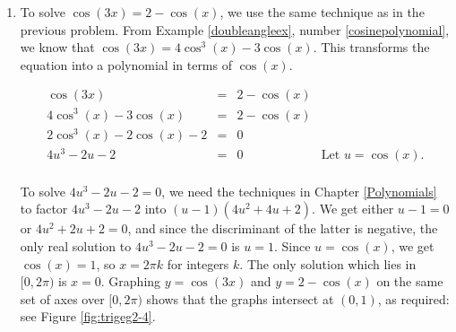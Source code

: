 {\begin{enumerate}
\drawexampleline

This gives $u = \frac{1}{2}$ or $u = 1$.  Since $u = \cos(x)$, we get $\cos(x) = \frac{1}{2}$ or $\cos(x) = 1$.  Solving  $\cos(x) = \frac{1}{2}$, we get $x = \frac{\pi}{3} + 2\pi k$ or $x = \frac{5\pi}{3} + 2\pi k$ for integers $k$.  From $\cos(x) = 1$, we get $x = 2\pi k$ for integers $k$.  The answers which lie in $[0,2\pi)$ are $x =0$,  $\frac{\pi}{3}$, and $\frac{5\pi}{3}$.  Graphing $y = \cos(2x)$ and $y = 3\cos(x) - 2$ in Figure \ref{fig:trigeg2-3}, we find, after a little extra effort, that the curves intersect in three places on $[0,2\pi)$, and  the $x$-coordinates of these points confirm our results.


\item  To solve $\cos(3x) = 2- \cos(x)$, we use the same technique as in the previous problem.  From Example \ref{doubleangleex}, number \ref{cosinepolynomial}, we know that $\cos(3x) = 4\cos^{3}(x) - 3\cos(x)$.  This transforms the equation into a polynomial in terms of $\cos(x)$.


\[ \begin{array}{rclr}

\cos(3x) & = &2- \cos(x) & \\
4\cos^{3}(x) - 3\cos(x) & = & 2- \cos(x) & \\
2\cos^{3}(x) - 2\cos(x) -2  & = & 0 & \\
4 u^3 - 2 u -2  & = & 0 & \text{Let $u = \cos(x)$.} \\ \end{array} \]

To solve $4u^3-2u-2=0$, we need the techniques in Chapter \ref{Polynomials} to factor $4u^3-2u-2$ into $(u-1)\left(4u^2+4u+2\right)$.  We get either $u-1 = 0$ or  $4u^2+2u+2=0$, and since the discriminant of the latter is negative, the only real solution to $4u^3-2u-2=0$ is $u = 1$.  Since $u = \cos(x)$, we get $\cos(x) = 1$, so $x = 2\pi k$ for integers $k$.  The only solution which lies in $[0,2\pi)$ is $x = 0$.  Graphing $y = \cos(3x)$ and $y = 2- \cos(x)$ on the same set of axes over $[0,2\pi)$ shows that the graphs intersect at  $(0,1)$, as required: see Figure \ref{fig:trigeg2-4}.




\end{enumerate}}
